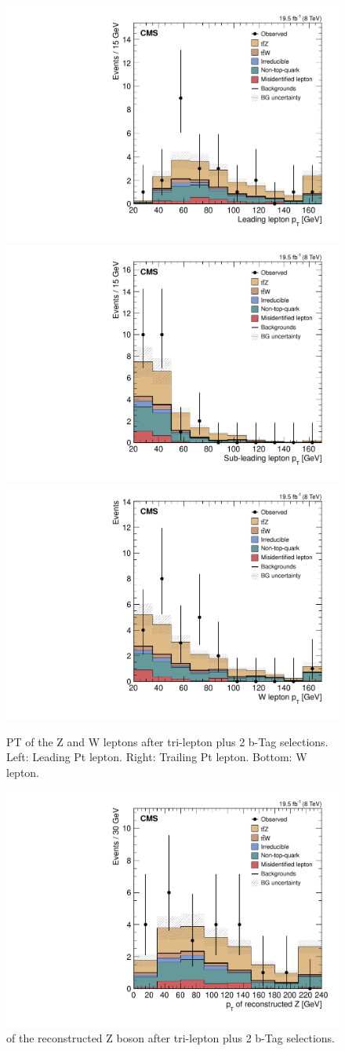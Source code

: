 \begin{figure}[h]
\begin{center}
\includegraphics[width=0.48\linewidth]{Figs/Plots_PreSelections/hZLep1Pt_3L2b.pdf}
\includegraphics[width=0.48\linewidth]{Figs/Plots_PreSelections/hZLep2Pt_3L2b.pdf}
\includegraphics[width=0.48\linewidth]{Figs/Plots_PreSelections/hWLepPt_3L2b.pdf}
\caption{\label{fig:hleppt_3L2b}
PT of the Z and W leptons after tri-lepton plus 2 b-Tag selections. Left: Leading Pt lepton. Right: Trailing Pt lepton. Bottom: W lepton.
}
\end{center}
\end{figure}

\begin{figure}[h]
\begin{center}
\includegraphics[width=0.48\linewidth]{Figs/Plots_PreSelections/hZPt_3L2b.pdf}
\caption{\label{fig:hzpt_3L2b}
\pt of the reconstructed Z boson after tri-lepton plus 2 b-Tag selections.
}
\end{center}
\end{figure}

